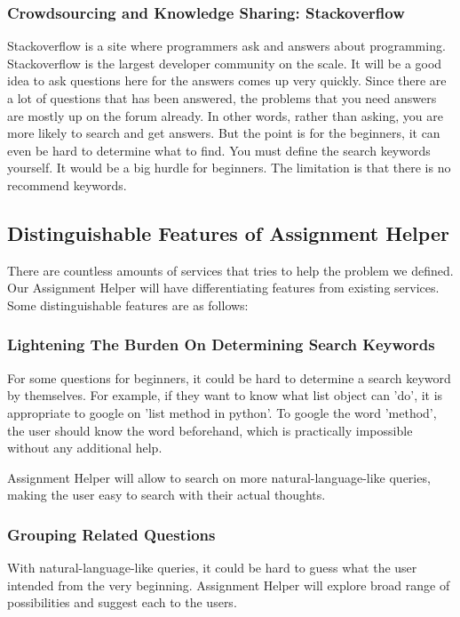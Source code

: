 \documentclass[conference]{IEEEtran}
\begin{document}
\subsubsection{Crowdsourcing and Knowledge Sharing: Stackoverflow}
Stackoverflow is a site where programmers ask and answers about programming. Stackoverflow is the largest developer community on the scale. It will be a good idea to ask questions here for the answers comes up very quickly.
Since there are a lot of questions that has been answered, the problems that you need answers are mostly up on the forum already. In other words, rather than asking, you are more likely to search and get answers. But the point is for the beginners, it can even be hard to determine what to find. You must define the search keywords yourself. It would be a big hurdle for beginners. The limitation is that there is no recommend keywords.

\subsection{Distinguishable Features of Assignment Helper} %
\label{sub:distinguishable_features_of_assignment_helper}
There are countless amounts of services that tries to help the problem we defined. Our Assignment Helper will have differentiating features from existing services. Some distinguishable features are as follows:

\subsubsection{Lightening The Burden On Determining Search Keywords}
For some questions for beginners, it could be hard to determine a search keyword by themselves. For example, if they want to know what list object can 'do', it is appropriate to google on 'list method in python'. To google the word 'method', the user should know the word beforehand, which is practically impossible without any additional help.


Assignment Helper will allow to search on more natural-language-like queries, making the user easy to search with their actual thoughts.

\subsubsection{Grouping Related Questions}
With natural-language-like queries, it could be hard to guess what the user intended from the very beginning. Assignment Helper will explore broad range of possibilities and suggest each to the users.
\end{document}
